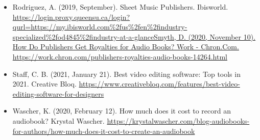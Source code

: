 \documentclass{article}
\begin{document}
\begin{itemize}
        \item Rodriguez, A. (2019, September). Sheet Music Publishers. Ibisworld. \url{https://login.proxy.queensu.ca/login?qurl=https://my.ibisworld.com%2fus%2fen%2findustry-specialized%2fod4845%2findustry-at-a-glanceSmyth, D. (2020, November 10). How Do Publishers Get Royalties for Audio Books? Work - Chron.Com. https://work.chron.com/publishers-royalties-audio-books-14264.html}
        \item Staff, C. B. (2021, January 21). Best video editing software: Top tools in 2021. Creative Bloq. \url{https://www.creativebloq.com/features/best-video-editing-software-for-designers}
        \item Wascher, K. (2020, February 12). How much does it cost to record an audiobook? Krystal Wascher. \url{https://krystalwascher.com/blog-audiobooks-for-authors/how-much-does-it-cost-to-create-an-audiobook}
    \end{itemize}
\end{document}
